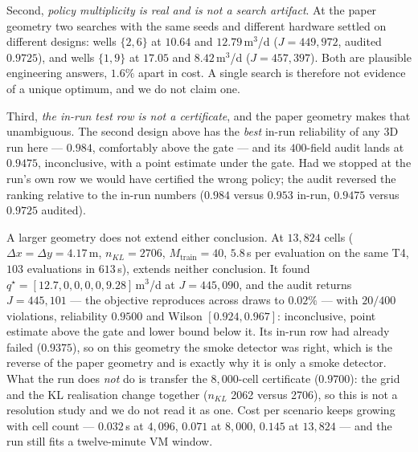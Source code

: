 Second, \emph{policy multiplicity is real and is not a search artifact}. At the
paper geometry two searches with the same seeds and different hardware settled on
different designs: wells $\{2,6\}$ at $10.64$ and $12.79$\,m$^3$/d ($J=449{,}972$,
audited $0.9725$), and wells $\{1,9\}$ at $17.05$ and $8.42$\,m$^3$/d
($J=457{,}397$). Both are plausible engineering answers, $1.6\%$ apart in cost. A
single search is therefore not evidence of a unique optimum, and we do not claim
one.

Third, \emph{the in-run test row is not a certificate}, and the paper geometry
makes that unambiguous. The second design above has the \emph{best} in-run
reliability of any 3D run here --- $0.984$, comfortably above the gate --- and its
$400$-field audit lands at $0.9475$, inconclusive, with a point estimate under the
gate. Had we stopped at the run's own row we would have certified the wrong
policy; the audit reversed the ranking relative to the in-run numbers
($0.984$ versus $0.953$ in-run, $0.9475$ versus $0.9725$ audited).

A larger geometry does not extend either conclusion. At $13{,}824$ cells ($\Delta x=\Delta y=4.17$\,m, $n_{KL}=2706$,
$M_{\text{train}}=40$, $5.8$\,s per evaluation on the same T4, $103$ evaluations in
$613$\,s), extends neither conclusion. It found
$q^\star=[12.7,0,0,0,0,9.28]$\,m$^3$/d at $J=445{,}090$, and the audit returns
$J=445{,}101$ --- the objective reproduces across draws to $0.02\%$ --- with
$20/400$ violations, reliability $0.9500$ and Wilson $[0.924,0.967]$:
inconclusive, point estimate above the gate and lower bound below it. Its in-run
row had already failed ($0.9375$), so on this geometry the smoke detector was
right, which is the reverse of the paper geometry and is exactly why it is only a
smoke detector. What the run does \emph{not} do is transfer the $8{,}000$-cell
certificate ($0.9700$): the grid and the KL realisation change together
($n_{KL}$ 2062 versus 2706), so this is not a resolution study and we do not read
it as one. Cost per scenario keeps growing with cell count --- $0.032$\,s at
$4{,}096$, $0.071$ at $8{,}000$, $0.145$ at $13{,}824$ --- and the run still fits
a twelve-minute VM window.

